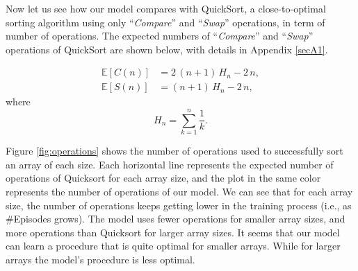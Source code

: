 \documentclass[pdflatex,sn-mathphys-num]{sn-jnl}%
\theoremstyle{thmstyleone}%
\theoremstyle{thmstyletwo}%
\theoremstyle{thmstylethree}%
\begin{document}
Now let us see how our model compares with QuickSort, a close-to-optimal sorting algorithm using only  ``\emph{Compare}'' and ``\emph{Swap}'' operations, in term of number of operations. The expected numbers of ``\emph{Compare}'' and ``\emph{Swap}'' operations of QuickSort are shown below, with details in Appendix \ref{secA1}.

\[
\begin{aligned}
\mathbb{E}[C(n)] &= 2\,(n+1)\,H_{n} - 2\,n, \\[6pt]
\mathbb{E}[S(n)] &= (n+1)\,H_{n} - 2\,n,
\end{aligned}
\]
where
\[
H_{n} = \sum_{k=1}^{n} \frac{1}{k}.
\]


Figure \ref{fig:operations} shows the number of operations used to successfully sort an array of each size. Each horizontal line represents the expected number of operations of Quicksort for each array size, and the plot in the same color represents the number of operations of our model. We can see that for each array size, the number of operations keeps getting lower in the training process (i.e., as \#Episodes grows). The model uses fewer operations for smaller array sizes, and more operations than Quicksort for larger array sizes. It seems that our model can learn a procedure that is quite optimal for smaller arrays. While for larger arrays the model's procedure is less optimal.
\end{document}
